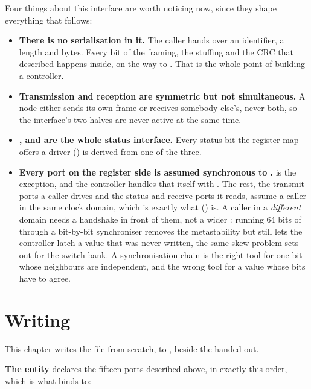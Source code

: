 Four things about this interface are worth noticing now, since they shape everything that follows:
\begin{itemize}
  \item \textbf{There is no serialisation in it.} The caller hands over an identifier, a length and
    bytes. Every bit of the framing, the stuffing and the CRC that  described happens
    inside, on the way to . That is the whole point of building a controller.
  \item \textbf{Transmission and reception are symmetric but not simultaneous.} A node either sends
    its own frame or receives somebody else's, never both, so the interface's two halves are never
    active at the same time.
  \item \textbf{,  and  are the whole status interface.}
    Every status bit the register map offers a driver () is derived from one of the
    three.
  \item \textbf{Every port on the register side is assumed synchronous to .}
     is the exception, and the controller handles that itself with . The
    rest, the transmit ports a caller drives and the status and receive ports it reads, assume a
    caller in the same clock domain, which is exactly what  ()
    is. A caller in a \emph{different} domain needs a handshake in front of them, not a wider
    : running 64 bits of  through a bit-by-bit synchroniser removes the
    metastability but still lets the controller latch a value that was never written, the same skew
    problem  sets out for the switch bank. A synchronisation chain is the right tool
    for one bit whose neighbours are independent, and the wrong tool for a value whose bits have to
    agree.
\end{itemize}

\section{Writing }
\label{c11:sec:writing}

This chapter writes the file from scratch, to , beside the
 handed out.

\textbf{The entity} declares the fifteen ports described above, in exactly this order, which is what
 binds to:

